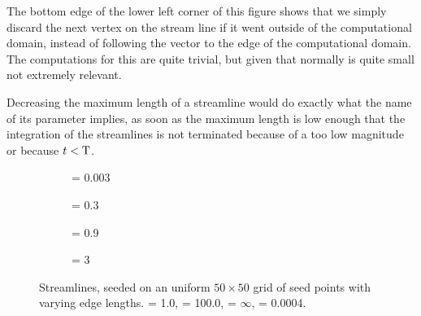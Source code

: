 The bottom edge of the lower left corner of this figure shows that we simply discard the next vertex on the stream line if it went outside of the computational domain, instead of following the vector to the edge of the computational domain. The computations for this are quite trivial, but given that normally \edgeLength is quite small not extremely relevant.

Decreasing the maximum length of a streamline would do exactly what the name of its parameter implies, as soon as the maximum length is low enough that the integration of the streamlines is not terminated because of a too low magnitude or because $t < \text{T}$. 

\begin{figure}
	\centering
	\begin{subfigure}{0.44\textwidth}
		\centering
		\caption{\edgeLength = 0.003}
		\label{fig:streamlines:results:edgeLengthVaries:e003}
	\end{subfigure}
	\begin{subfigure}{0.44\textwidth}
		\centering
		\caption{\edgeLength = 0.3}
		\label{fig:streamlines:results:edgeLengthVaries:e03}
	\end{subfigure}	
	\begin{subfigure}{0.44\textwidth}
		\centering
		\caption{\edgeLength = 0.9}
		\label{fig:streamlines:results:edgeLengthVaries:e09}
	\end{subfigure}		
	\begin{subfigure}{0.44\textwidth}
		\centering
		\caption{\edgeLength = 3}
		\label{fig:streamlines:results:edgeLengthVaries:e3}
	\end{subfigure}			
	\caption{Streamlines, seeded on an uniform $50 \times 50$ grid of seed points with varying edge lengths. \timeStep = 1.0, \timeStepMax = 100.0, \edgeLengthMax = $\infty$, \magnitudeMin = 0.0004.}
	\label{fig:streamlines:results:edgeLengthVaries}
\end{figure}



